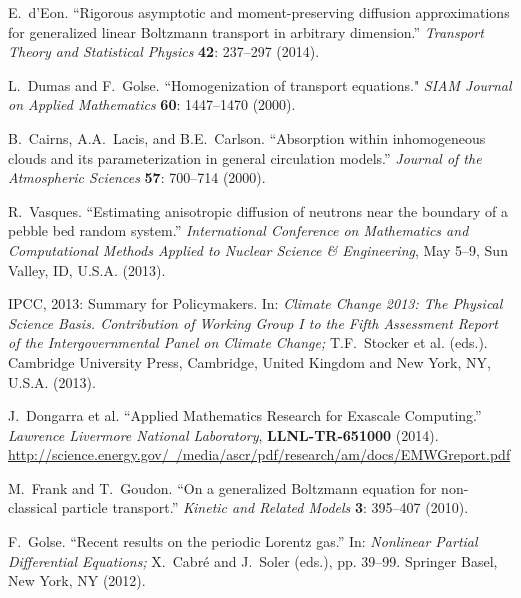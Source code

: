 \documentclass[12pt]{article}
\begin{document}
\begin{thebibliography}{10}
E.~d'Eon.
``Rigorous asymptotic and moment-preserving diffusion approximations for generalized linear Boltzmann transport in arbitrary dimension.''
\textit{Transport Theory and Statistical Physics} \textbf{42}: 237--297 (2014).\vspace{-5pt}

L.~Dumas and F.~Golse.
``Homogenization of transport equations."
\textit{SIAM Journal on Applied Mathematics} \textbf{60}: 1447--1470 (2000). \vspace{-5pt}

B.~Cairns, A.A.~Lacis, and B.E.~Carlson. 
``Absorption within inhomogeneous clouds and its parameterization in general circulation models.''
\textit{Journal of the Atmospheric Sciences} \textbf{57}: 700--714 (2000).\vspace{-5pt}

R.~Vasques.
``Estimating anisotropic diffusion of neutrons near the boundary of a pebble bed random system.''
\textit{International Conference on Mathematics and Computational Methods Applied to Nuclear Science \& Engineering}, May 5--9, Sun Valley, ID, U.S.A. (2013).\vspace{-5pt}

IPCC, 2013: Summary for Policymakers.
In: \textit{Climate Change 2013: The Physical Science Basis. Contribution of
Working Group I to the Fifth Assessment Report of the Intergovernmental Panel on Climate Change;} T.F.~Stocker et al. (eds.).
Cambridge University Press, Cambridge, United Kingdom and New York, NY, U.S.A. (2013).
\vspace{-5pt}

J.~Dongarra et al.
``Applied Mathematics Research for Exascale Computing.''
\textit{Lawrence Livermore
National Laboratory}, \textbf{LLNL-TR-651000} (2014).\\
\href{http://science.energy.gov/~/media/ascr/pdf/research/am/docs/EMWGreport.pdf}{http://science.energy.gov/~/media/ascr/pdf/research/am/docs/EMWGreport.pdf}
\vspace{-5pt}

M.~Frank and T.~Goudon.
``On a generalized Boltzmann equation for non-classical particle transport.''
\textit{Kinetic and Related Models} \textbf{3}: 395--407 (2010).
\vspace{-5pt}

F.~Golse.
``Recent results on the periodic Lorentz gas.''
In: \textit{Nonlinear Partial Differential Equations;} X.~Cabr\'e and J.~Soler (eds.), pp. 39--99.
Springer Basel, New York, NY (2012).
\vspace{-5pt}


\end{thebibliography}
\end{document}
